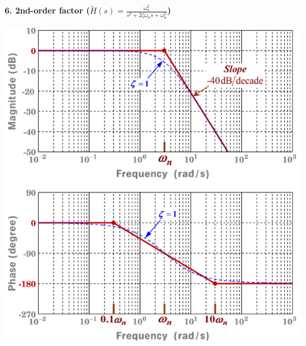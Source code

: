 \documentclass[landscape,a4paper]{extarticle}
\newenvironment{Figure}
  {\par\medskip\noindent\minipage{\linewidth}}
  {\endminipage\par\medskip}
\begin{document}
\begin{multicols*}{5}
    \textbf{6. 2nd-order factor ($\tilde{H}(s) = \frac{\omega_n^2}{s^2+2\zeta\omega_ns + \omega_n^2}$)}
    \begin{Figure}
        \centering
        \includegraphics[width=\linewidth]{bode_2ndOrder.png}        
    \end{Figure}


\end{multicols*}
\end{document}
